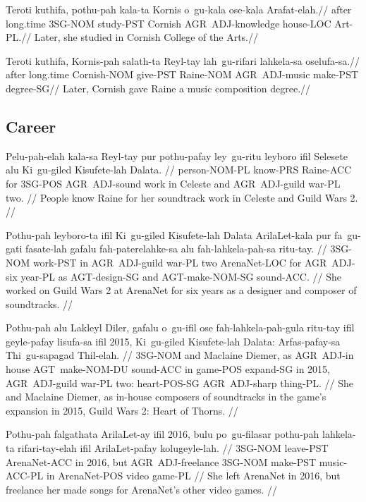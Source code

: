\ex
\begingl
\gla  Teroti kuthifa,  pothu-pah kala-ta  Kornis o~gu-kala ose-kala  Arafat-elah.//
\glb  after  long.time 3SG-NOM study-PST Cornish AGR~ADJ-knowledge house-LOC Art-PL.//
\glft Later, she studied in Cornish College of the Arts.//
\endgl
\xe

\ex
\begingl
\gla  Teroti kuthifa,  Kornis-pah salath-ta Reyl-tay  lah~gu-rifari lahkela-sa oselufa-sa.//
\glb  after  long.time Cornish-NOM give-PST Raine-NOM  AGR~ADJ-music make-PST degree-SG//
\glft Later, Cornish gave Raine a music composition degree.//
\endgl
\xe

\subsection{Career}
\ex
\begingl
\gla Pelu-pah-elah kala-sa Reyl-tay pur pothu-pafay ley~gu-ritu leyboro ifil Selesete alu Ki~gu-giled Kisufete-lah Dalata. //
\glb person-NOM-PL know-PRS Raine-ACC for 3SG-POS AGR~ADJ-sound work in Celeste and AGR~ADJ-guild war-PL two. //
\glft People know Raine for her soundtrack work in Celeste and Guild Wars 2. //
\endgl
\xe

\ex
\begingl
\gla Pothu-pah leyboro-ta ifil Ki~gu-giled Kisufete-lah Dalata  ArilaLet-kala pur fa~gu-gati fasate-lah gafalu  fah-paterelahke-sa alu fah-lahkela-pah-sa  ritu-tay. //
\glb 3SG-NOM work-PST in AGR~ADJ-guild war-PL two  ArenaNet-LOC for AGR~ADJ-six year-PL as  AGT-design-SG and AGT-make-NOM-SG  sound-ACC. //
\glft She worked on Guild Wars 2 at ArenaNet for six years as a designer and composer of soundtracks. //
\endgl
\xe

\ex
\begingl
\gla Pothu-pah alu Lakleyl Diler, gafalu o~gu-ifil ose fah-lahkela-pah-gula  ritu-tay ifil  geyle-pafay lisufa-sa ifil 2015, Ki~gu-giled Kisufete-lah Dalata: Arfas-pafay-sa  Thi~gu-sapagad Thil-elah. //
\glb 3SG-NOM and Maclaine Diemer, as AGR~ADJ-in house AGT~make-NOM-DU  sound-ACC in  game-POS expand-SG in 2015, AGR~ADJ-guild war-PL two: heart-POS-SG  AGR~ADJ-sharp thing-PL. //
\glft She and Maclaine Diemer, as in-house composers of soundtracks in the game's expansion in 2015, Guild Wars 2: Heart of Thorns. //
\endgl
\xe

\ex
\begingl
\gla Pothu-pah falgathata ArilaLet-ay ifil 2016, bulu po~gu-filasar pothu-pah lahkela-ta rifari-tay-elah ifil ArilaLet-pafay   kolugeyle-lah. //
\glb 3SG-NOM leave-PST ArenaNet-ACC in 2016, but AGR~ADJ-freelance 3SG-NOM make-PST music-ACC-PL in ArenaNet-POS  video game-PL //
\glft She left ArenaNet in 2016, but freelance her made songs for ArenaNet's other video games. //
\endgl
\xe

